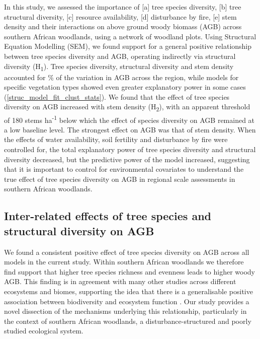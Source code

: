 \documentclass[11pt,a4paper]{article}
\begin{document}
In this study, we assessed the importance of [a] tree species diversity, [b] tree structural diversity, [c] resource availability, [d] disturbance by fire, [e] stem density and their interactions on above ground woody biomass (AGB) across southern African woodlands, using a network of \nplots{} woodland plots. Using Structural Equation Modelling (SEM), we found support for a general positive relationship between tree species diversity and AGB, operating indirectly via structural diversity (H\textsubscript{1}). Tree species diversity, structural diversity and stem density accounted for \smrsq{}\% of the variation in AGB across the region, while models for specific vegetation types showed even greater explanatory power in some cases (\autoref{struc_model_fit_clust_stats}). We found that the effect of tree species diversity on AGB increased with stem density (H\textsubscript{2}), with an apparent threshold of 180 stems ha\textsuperscript{-1} below which the effect of species diversity on AGB remained at a low baseline level. The strongest effect on AGB was that of stem density. When the effects of water availability, soil fertility and disturbance by fire were controlled for, the total explanatory power of tree species diversity and structural diversity decreased, but the predictive power of the model increased, suggesting that it is important to control for environmental covariates to understand the true effect of tree species diversity on AGB in regional scale assessments in southern African woodlands.

\subsection{Inter-related effects of tree species and structural diversity on AGB}

% 
We found a consistent positive effect of tree species diversity on AGB across all models in the current study. Within southern African woodlands we therefore find support that higher tree species richness and evenness leads to higher woody AGB. This finding is in agreement with many other studies across different ecosystems and biomes, supporting the idea that there is a generalisable positive association between biodiversity and ecosystem function \citep{Liang2016, Cardinale2009}. Our study provides a novel dissection of the mechanisms underlying this relationship, particularly in the context of southern African woodlands, a disturbance-structured and poorly studied ecological system.
\end{document}
